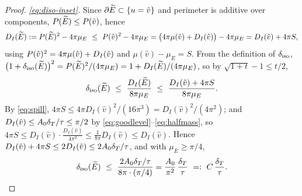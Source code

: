 \begin{proof}
\emph{\eqref{eq:diso-inset}.} Since $\partial\widetilde{E}\subset\{u=\hat v\}$ and
perimeter is additive over components, $P(\widetilde{E})\le P(\hat v)$, hence
\[
   D_I(\widetilde{E}):=P(\widetilde{E})^2-4\pi\mu_E
   \ \le\ P(\hat v)^2-4\pi\mu_E
   =\bigl(4\pi\mu(\hat v)+D_I(\hat v)\bigr)-4\pi\mu_E
   =D_I(\hat v)+4\pi S,
\]
using $P(\hat v)^2=4\pi\mu(\hat v)+D_I(\hat v)$ and
$\mu(\hat v)-\mu_E=S$. From the definition of $\delta_{\mathrm{iso}}$,
$\bigl(1+\delta_{\mathrm{iso}}(\widetilde{E})\bigr)^2=P(\widetilde{E})^2/(4\pi\mu_E)=1+D_I(\widetilde{E})/(4\pi\mu_E)$,
so by $\sqrt{1+t}-1\le t/2$,
\[
   \diso(\Etil)\ \le\ \frac{D_I(\Etil)}{8\pi\mu_E}
   \ \le\ \frac{D_I(\hat v)+4\pi S}{8\pi\mu_E}.
\]
By \eqref{eq:spill}, $4\pi S\le 4\pi D_I(\hat v)^2/(16\pi^3)
=D_I(\hat v)^2/(4\pi^2)$; and $D_I(\hat v)\le A_0\delta_T/\tau\le\pi/2$ by
\eqref{eq:goodlevel}--\eqref{eq:halfmass}, so $4\pi S\le D_I(\hat v)\cdot
\frac{D_I(\hat v)}{4\pi^2}\le\frac{1}{8\pi}D_I(\hat v)\le D_I(\hat v)$.
Hence $D_I(\hat v)+4\pi S\le2D_I(\hat v)\le2A_0\delta_T/\tau$, and with
$\mu_E\ge\pi/4$,
\[
   \diso(\Etil)\ \le\ \frac{2A_0\dT/\tau}{8\pi\cdot(\pi/4)}
   =\frac{A_0}{\pi^2}\,\frac{\dT}{\tau}\ =:\ C\,\frac{\dT}{\tau}.
\]


\end{proof}
